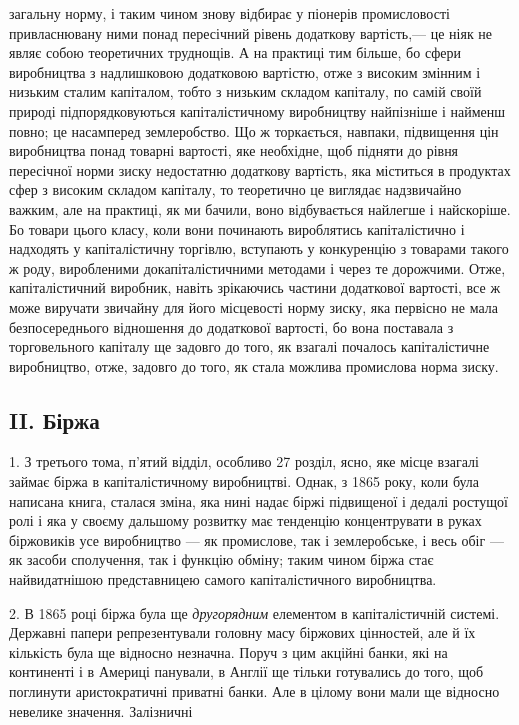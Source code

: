 \parcont{}  %
загальну норму, і таким чином знову відбирає у піонерів промисловості привласнювану ними понад пересічний рівень додаткову
вартість,— це ніяк не являє собою теоретичних труднощів. А на практиці тим більше, бо сфери виробництва з надлишковою
додатковою вартістю, отже з високим змінним і низьким сталим капіталом, тобто з низьким складом капіталу, по самій своїй
природі підпорядковуються капіталістичному виробництву найпізніше і найменш повно; це насамперед землеробство. Що ж
торкається, навпаки, підвищення цін виробництва понад товарні вартості, яке необхідне, щоб підняти до рівня пересічної норми
зиску недостатню додаткову вартість, яка міститься в продуктах сфер з високим складом капіталу, то теоретично це виглядає
надзвичайно важким, але на практиці, як ми бачили, воно відбувається найлегше і найскоріше. Бо товари цього класу, коли вони
починають вироблятись капіталістично і надходять у капіталістичну торгівлю, вступають у конкуренцію з товарами такого ж
роду, виробленими докапіталістичними методами і через те дорожчими. Отже, капіталістичний виробник, навіть зрікаючись
частини додаткової вартості, все ж може виручати звичайну для його місцевості норму зиску, яка первісно не мала
безпосереднього відношення до додаткової вартості, бо вона поставала з торговельного капіталу ще задовго до того, як взагалі
почалось капіталістичне виробництво, отже, задовго до того, як стала можлива промислова норма зиску.

\subsection{II. Біржа}

1. З третього тома, п’ятий відділ, особливо 27 розділ, ясно, яке місце взагалі займає біржа в капіталістичному виробництві. Однак, з 1865 року, коли була написана книга, сталася зміна, яка нині надає біржі підвищеної і дедалі ростущої ролі і яка у
своєму дальшому розвитку має тенденцію концентрувати в руках біржовиків усе виробництво — як промислове, так і землеробське,
і весь обіг — як засоби сполучення, так і функцію обміну; таким чином біржа стає найвидатнішою представницею самого
капіталістичного виробництва.

2. В 1865 році біржа була ще \emph{другорядним} елементом в капіталістичній системі. Державні папери
репрезентували головну масу біржових цінностей, але й їх кількість була ще відносно незначна. Поруч з цим акційні банки, які
на континенті і в Америці панували, в Англії ще тільки готувались до того, щоб поглинути аристократичні приватні банки. Але
в цілому вони мали ще відносно невелике значення. Залізничні

\parbreak{}  %
